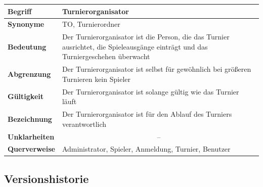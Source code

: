 \documentclass[11pt]{article}
\begin{document}
\begin{tabularx}{\textwidth}{| p{} | p{} |}
	\hline
	\textbf{Begriff} & Turnierorganisator\\ 
	\hline
	\textbf{Synonyme} & TO, Turnierordner\\
	\hline 
	\textbf{Bedeutung} & Der Turnierorganisator ist die Person, die das Turnier ausrichtet, die Spieleausgänge einträgt und das Turniergeschehen überwacht\\
	\hline
	\textbf{Abgrenzung} & Der Turnierorganisator ist selbst für gewöhnlich bei größeren Turnieren kein Spieler\\
	\hline
	\textbf{Gültigkeit} & Der Turnierorganisator ist solange gültig wie das Turnier läuft\\
	\hline
	\textbf{Bezeichnung} & Der Turnierorganisator ist für den Ablauf des Turniers verantwortlich\\
	\hline
	\textbf{Unklarheiten} & \multicolumn{1}{c|}{--} \\
	\hline
	\textbf{Querverweise} &  Administrator, Spieler, Anmeldung, Turnier, Benutzer\\
	\hline
\end{tabularx}

\newpage

\subsection{Versionshistorie}
\end{document}
